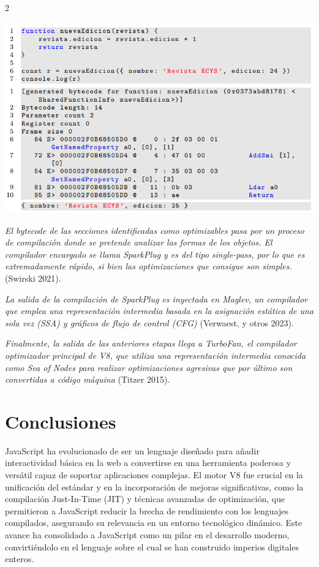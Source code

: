 \documentclass[12pt,spanish,Letterpaper,openany]{book}
\begin{document}
\begin {multicols}{2}
\begin {flushleft}
\begin{minipage}[c]{\columnwidth}
\begin{center}\includegraphics[width=1\linewidth]{imagenes_articulos/sp66_02} \end{center}

\end{minipage}
\end {flushleft}

\emph{El bytecode de las secciones identificadas como optimizables pasa por un proceso de compilación donde se pretende analizar las formas de los objetos. El compilador encargado se llama SparkPlug y es del tipo single-pass, por lo que es extremadamente rápido, si bien las optimizaciones que consigue son simples.} (Swirski 2021).

\emph{La salida de la compilación de SparkPlug es inyectada en Maglev, un compilador que emplea una representación intermedia basada en la asignación estática de una sola vez (SSA) y gráficos de flujo de control (CFG)} (Verwaest, y otros 2023).

\emph{Finalmente, la salida de las anteriores etapas llega a TurboFan, el compilador optimizador principal de V8, que utiliza una representación intermedia conocida como Sea of Nodes para realizar optimizaciones agresivas que por último son convertidas a código máquina} (Titzer 2015).

\hypertarget{conclusiones-4}{%
\section{Conclusiones}\label{conclusiones-4}}

JavaScript ha evolucionado de ser un lenguaje diseñado para añadir interactividad básica en la web a convertirse en una herramienta poderosa y versátil capaz de soportar aplicaciones complejas. El motor V8 fue crucial en la unificación del estándar y en la incorporación de mejoras significativas, como la compilación Just-In-Time (JIT) y técnicas avanzadas de optimización, que permitieron a JavaScript reducir la brecha de rendimiento con los lenguajes
compilados, asegurando su relevancia en un entorno tecnológico dinámico. Este avance ha consolidado a JavaScript como un pilar en el desarrollo moderno, convirtiéndolo en el lenguaje sobre el cual se han construido imperios digitales enteros.


\end{multicols}
\end{document}

